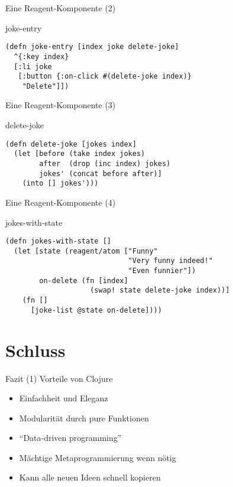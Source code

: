 \documentclass[presentation]{beamer}
\begin{document}
\begin{frame}[fragile]{Eine Reagent-Komponente (2)}
  \begin{block}{joke-entry}
\begin{verbatim}
(defn joke-entry [index joke delete-joke]
  ^{:key index}
  [:li joke
   [:button {:on-click #(delete-joke index)}
    "Delete"]])
\end{verbatim}
  \end{block}
\end{frame}

\begin{frame}[fragile]{Eine Reagent-Komponente (3)}
  \begin{block}{delete-joke}
\begin{verbatim}
(defn delete-joke [jokes index]
  (let [before (take index jokes)
        after  (drop (inc index) jokes)
        jokes' (concat before after)]
    (into [] jokes')))
\end{verbatim}
  \end{block}
\end{frame}

\begin{frame}[fragile]{Eine Reagent-Komponente (4)}
  \begin{block}{jokes-with-state}
\begin{verbatim}
(defn jokes-with-state []
  (let [state (reagent/atom ["Funny"
                             "Very funny indeed!"
                             "Even funnier"])
        on-delete (fn [index]
                    (swap! state delete-joke index))]
    (fn []
      [joke-list @state on-delete])))
\end{verbatim}
  \end{block}
\end{frame}

\section{Schluss}

\begin{frame}{Fazit (1)}
  Vorteile von Clojure
  \begin{itemize}
  \item Einfachheit und Eleganz
  \item Modularität durch pure Funktionen
  \item ``Data-driven programming''
  \item Mächtige Metaprogrammierung wenn nötig
  \item Kann alle neuen Ideen schnell kopieren
  \end{itemize}
\end{frame}
\end{document}
